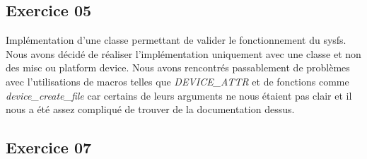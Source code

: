 \documentclass{ReportTemplate}
\begin{document}
\subsection{Exercice 05}
Implémentation d'une classe permettant de valider le fonctionnement du sysfs. 
Nous avons décidé de réaliser l'implémentation uniquement avec une classe et non
des misc ou platform device. Nous avons rencontrés passablement de problèmes
avec l'utilisations de macros telles que \textit{DEVICE\_ATTR} et de fonctions
comme \textit{device\_create\_file} car certains de leurs arguments ne nous
étaient pas clair et il nous a été assez compliqué de trouver de la
documentation dessus.
\subsection{Exercice 07}
\end{document}
